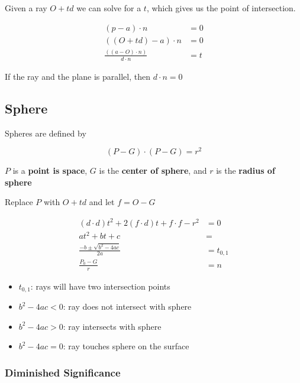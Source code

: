     Given a ray $ O + td $ we can solve for a $ t $, which gives us the
    point of intersection.

    \begin{align*}
      \left( p - a \right) \cdot n &= 0 \\
      \left( \left( O + td \right) - a \right) \cdot n &= 0 \\
      \frac{\left( \left( a - O \right) \cdot n \right)}{d \cdot n} &= t
    \end{align*}

    If the ray and the plane is parallel, then $ d \cdot n = 0 $

  \subsection{Sphere}

    Spheres are defined by

    \begin{equation}
      \left( P - G \right) \cdot \left( P - G \right) = r^{2}
    \end{equation}

    $ P $ is a \textbf{point is space}, $ G $ is the \textbf{center of sphere},
    and $ r $ is the \textbf{radius of sphere}

    Replace $ P $ with $ O + td $ and let $ f = O - G  $

    \begin{align}
      \left( d \cdot d \right) t^{2}
        + 2 \left( f \cdot d \right) t
        + f \cdot f - r^{2}
      &= 0 \\
      a t^{2} + bt + c &= \\
      \frac{-b \pm \sqrt{b^{2} - 4ac}}{2a} &= t_{0, 1} \\
      \frac{P_{0} - G}{r} &= n
    \end{align}

    \begin{itemize}
      \item $ t_{0, 1} $: rays will have two intersection points
      \item $ b^{2} - 4ac < 0 $: ray does not intersect with sphere
      \item $ b^{2} - 4ac > 0 $: ray intersects with sphere
      \item $ b^{2} - 4ac = 0 $: ray touches sphere on the surface
    \end{itemize}

    \subsubsection{Diminished Significance}

